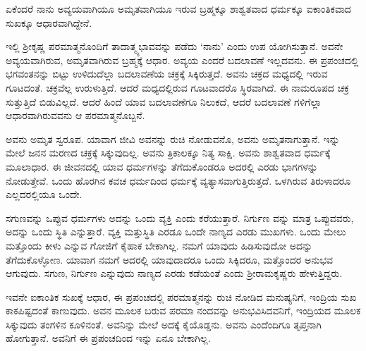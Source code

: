 {\small ಏಕೆಂದರೆ ನಾನು ಅವ್ಯಯವಾಗಿಯೂ ಅಮೃತವಾಗಿಯೂ ಇರುವ ಬ್ರಹ್ಮಕ್ಕೂ ಶಾಶ್ವತವಾದ ಧರ್ಮಕ್ಕೂ ಐಕಾಂತಿಕವಾದ ಸುಖಕ್ಕೂ ಆಧಾರವಾಗಿದ್ದೇನೆ.}

ಇಲ್ಲಿ ಶ‍್ರೀಕೃಷ್ಣ ಪರಮಾತ್ಮನೊಂದಿಗೆ ತಾದಾತ್ಮ್ಯಭಾವವನ್ನು ಪಡೆದು ‘ನಾನು’ ಎಂದು ಉಪ ಯೋಗಿಸುತ್ತಾನೆ. ಅವನೇ ಅವ್ಯಯವಾಗಿರುವ, ಅಮೃತವಾಗಿರುವ ಬ್ರಹ್ಮಕ್ಕೆ ಆಧಾರ. ಅವ್ಯಯ ಎಂದರೆ ಬದಲಾವಣೆ ಇಲ್ಲದವನು. ಈ ಪ್ರಪಂಚದಲ್ಲಿ ಭಗವಂತನನ್ನು ಬಿಟ್ಟು ಉಳಿದುದೆಲ್ಲಾ ಬದಲಾವಣೆಯ ಚಕ್ರಕ್ಕೆ ಸಿಕ್ಕಿರುತ್ತದೆ. ಅವನು ಚಕ್ರದ ಮಧ್ಯದಲ್ಲಿ ಇರುವ ಗೂಟದಂತೆ. ಚಕ್ರವೆಲ್ಲ ಉರುಳುತ್ತಿದೆ. ಆದರೆ ಮಧ್ಯದಲ್ಲಿರುವ ಗೂಟವಾದರೊ ಸ್ಥಿರವಾಗಿದೆ. ಈ ನಾಮರೂಪದ ಚಕ್ರ ಸುತ್ತುತ್ತಿದೆ ಬಿಡುವಿಲ್ಲದೆ. ಆದರೆ ಹಿಂದೆ ಯಾವ ಬದಲಾವಣೆಗೂ ನಿಲುಕದೆ, ಆದರೆ ಬದಲಾವಣೆ ಗಳಿಗೆಲ್ಲಾ ಆಧಾರವಾಗಿರುವವನು ಆ ಪರಮಾತ್ಮನೊಬ್ಬನೆ.

ಅವನು ಅಮೃತ ಸ್ವರೂಪ. ಯಾವಾಗ ಜೀವಿ ಅವನನ್ನು ರುಚಿ ನೋಡುವನೊ, ಅವನು ಅಮೃತನಾಗುತ್ತಾನೆ. ಇನ್ನು ಮೇಲೆ ಜನನ ಮರಣದ ಚಕ್ರಕ್ಕೆ ಸಿಕ್ಕುವುದಿಲ್ಲ. ಅವನು ತ್ರಿಕಾಲಕ್ಕೂ ನಿತ್ಯ ಸಾಕ್ಷಿ. ಅವನು ಶಾಶ್ವತವಾದ ಧರ್ಮಕ್ಕೆ ಮೂಲಾಧಾರ. ಈ ಜೀವನದಲ್ಲಿ ಯಾವ ಧರ್ಮಗಳನ್ನು ತೆಗೆದುಕೊಂಡರೂ ಅದರಲ್ಲಿ ಎರಡು ಭಾಗಗಳನ್ನು ನೋಡುತ್ತೇವೆ. ಒಂದು ಹೊರಗಿನ ಕವಚ ಧರ್ಮದಿಂದ ಧರ್ಮಕ್ಕೆ ವ್ಯತ್ಯಾಸವಾಗುತ್ತಿರುತ್ತದೆ. ಒಳಗಿರುವ ತಿರುಳಾದರೂ ಎಲ್ಲದರಲ್ಲಿಯೂ ಒಂದೇ.

ಸಗುಣವನ್ನು ಒಪ್ಪುವ ಧರ್ಮಗಳು ಅದನ್ನು ಒಂದು ವ್ಯಕ್ತಿ ಎಂದು ಕರೆಯುತ್ತಾರೆ. ನಿರ್ಗುಣ ವನ್ನು ಮಾತ್ರ ಒಪ್ಪುವವರು, ಅದನ್ನು ಒಂದು ಸ್ಥಿತಿ ಎನ್ನುತ್ತಾರೆ. ವ್ಯಕ್ತಿ ಮತ್ತುಸ್ಥಿತಿ ಎರಡೂ ಒಂದೇ ನಾಣ್ಯದ ಎರಡು ಮುಖಗಳು. ಒಂದು ಮೇಲು ಮತ್ತೊಂದು ಕೀಳು ಎನ್ನುವ ಗೋಜಿಗೆ ಕೈಹಾಕ ಬೇಕಾಗಿಲ್ಲ. ನಮಗೆ ಯಾವುದು ಹಿಡಿಸುವುದೋ ಅದನ್ನು ತೆಗೆದುಕೊಳ್ಳೋಣ. ಯಾವಾಗ ನಮಗೆ ಅದರಲ್ಲಿ ಯಾವುದಾದರೂ ಒಂದು ಸಿಕ್ಕಿದರೂ, ಮತ್ತೊಂದರ ಅನುಭವ ಆಗುವುದು. ಸಗುಣ, ನಿರ್ಗುಣ ಎನ್ನುವುದು ನಾಣ್ಯದ ಎರಡು ಕಡೆಯಂತೆ ಎಂದು ಶ‍್ರೀರಾಮಕೃಷ್ಣರು ಹೇಳುತ್ತಿದ್ದರು.

ಇವನೇ ಐಕಾಂತಿಕ ಸುಖಕ್ಕೆ ಆಧಾರ, ಈ ಪ್ರಪಂಚದಲ್ಲಿ ಪರಮಾತ್ಮನನ್ನು ರುಚಿ ನೋಡಿದ ಮನುಷ್ಯನಿಗೆ, ಇಂದ್ರಿಯ ಸುಖ ಕಾಕಪಿಷ್ಟದಂತೆ ಕಾಣುವುದು. ಅವನ ಮೂಲಕ ಬರುವ ಪರಮಾ ನಂದವನ್ನು ಅನುಭವಿಸಿದವನಿಗೆ, ಇಂದ್ರಿಯದ ಮೂಲಕ ಸಿಕ್ಕುವುದು ತಂಗಳಿನ ಕೂಳಿನಂತೆ. ಅವನಿನ್ನು ಮೇಲೆ ಅದಕ್ಕೆ ಕೈಯೊಡ್ಡನು. ಅವನು ಎಂದೆಂದಿಗೂ ತೃಪ್ತನಾಗಿ ಹೋಗುತ್ತಾನೆ. ಅವನಿಗೆ ಈ ಪ್ರಪಂಚದಿಂದ ಇನ್ನು ಏನೂ ಬೇಕಾಗಿಲ್ಲ.

